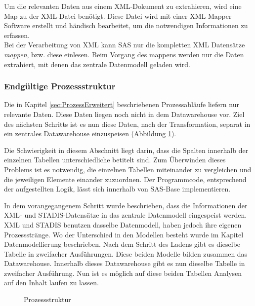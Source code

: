 			Um die relevanten Daten aus einem XML-Dokument zu extrahieren, wird eine Map zu der XML-Datei benötigt. 
			Diese Datei wird mit einer XML Mapper Software erstellt und händisch bearbeitet, um die notwendigen Informationen zu erfassen. \\
			Bei der Verarbeitung von XML kann SAS nur die kompletten XML Datensätze \textit{mappen}, bzw. diese einlesen. 
			Beim Vorgang des mappens werden nur die Daten extrahiert, mit denen das zentrale Datenmodell geladen wird.
		
		\subsubsection{Endgültige Prozessstruktur}
		\label{endprozess}
		
			Die in Kapitel \ref{sec:ProzessErweitert} beschriebenen Prozessabläufe liefern nur relevante Daten. 
			Diese Daten liegen noch nicht in dem Datawarehouse vor. 
			Ziel des nächsten Schritts ist es nun diese Daten, nach der Transformation, separat in ein zentrales Datawarehouse einzuspeisen (Abbildung \ref{fig:ErweiterteStruktur}). 
			
			Die Schwierigkeit in diesem Abschnitt liegt darin, dass die Spalten innerhalb der einzelnen Tabellen unterschiedliche betitelt sind. 
			Zum Überwinden dieses Problems ist es notwendig, die einzelnen Tabellen miteinander zu vergleichen und die jeweiligen Elemente einander zuzuordnen.
			Der Programmcode, entsprechend der aufgestellten Logik, lässt sich innerhalb von SAS-Base implementieren. 
			
			In dem vorangegangenem Schritt wurde beschrieben, dass die Informationen der XML- und STADIS-Datensätze in das zentrale Datenmodell eingespeist werden. 
			XML und STADIS benutzen dasselbe Datenmodell, haben jedoch ihre eigenen Prozessstränge. 
			Wo der Unterschied in den Modellen besteht wurde im Kapitel Datenmodellierung beschrieben.
			Nach dem Schritt des Ladens gibt es dieselbe Tabelle in zweifacher Ausführungen. 
			Diese beiden Modelle bilden zusammen das Datawarehouse. 
			Innerhalb dieses Datawarehouse gibt es nun dieselbe Tabelle in zweifacher Ausführung. 
			Nun ist es möglich auf diese beiden Tabellen Analysen auf den Inhalt laufen zu lassen.
			
			\begin{figure}[htbp]
						\caption{Prozessstruktur}
						\label{fig:ErweiterteStruktur}
			\end{figure}
